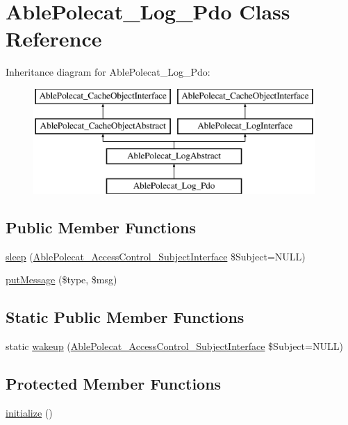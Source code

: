 \hypertarget{class_able_polecat___log___pdo}{}\section{Able\+Polecat\+\_\+\+Log\+\_\+\+Pdo Class Reference}
\label{class_able_polecat___log___pdo}
Inheritance diagram for Able\+Polecat\+\_\+\+Log\+\_\+\+Pdo\+:\begin{figure}[H]
\begin{center}
\leavevmode
\includegraphics[height=4.000000cm]{class_able_polecat___log___pdo}
\end{center}
\end{figure}
\subsection*{Public Member Functions}
\begin{DoxyCompactItemize}
\item 
\hyperlink{class_able_polecat___log___pdo_a365e24d7b066205cafa2a5cce3a4f224}{sleep} (\hyperlink{interface_able_polecat___access_control___subject_interface}{Able\+Polecat\+\_\+\+Access\+Control\+\_\+\+Subject\+Interface} \$Subject=N\+U\+L\+L)
\item 
\hyperlink{class_able_polecat___log___pdo_a952026c3d234eb84a9f211b17f33a110}{put\+Message} (\$type, \$msg)
\end{DoxyCompactItemize}
\subsection*{Static Public Member Functions}
\begin{DoxyCompactItemize}
\item 
static \hyperlink{class_able_polecat___log___pdo_a3f2135f6ad45f51d075657f6d20db2cd}{wakeup} (\hyperlink{interface_able_polecat___access_control___subject_interface}{Able\+Polecat\+\_\+\+Access\+Control\+\_\+\+Subject\+Interface} \$Subject=N\+U\+L\+L)
\end{DoxyCompactItemize}
\subsection*{Protected Member Functions}
\begin{DoxyCompactItemize}
\item 
\hyperlink{class_able_polecat___log___pdo_a91098fa7d1917ce4833f284bbef12627}{initialize} ()
\end{DoxyCompactItemize}
